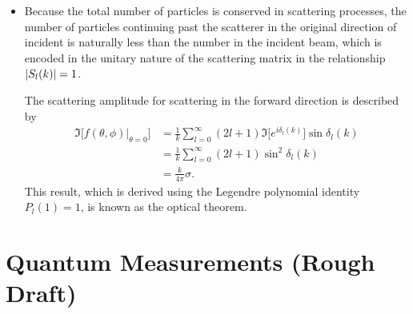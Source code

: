 \documentclass[11pt, a4paper]{article}
\begin{document}
\begin{itemize}
    \item Because the total number of particles is conserved in scattering processes, the number of particles continuing past the scatterer in the original direction of incident is naturally less than the number in the incident beam, which is encoded in the unitary nature of the scattering matrix in the relationship $ \abs{S_{l}(k)} = 1 $. 

    The scattering amplitude for scattering in the forward direction is described by
    \begin{align*}
        \Im \big[ f(\theta, \phi)\big |_{\theta = 0} \big] &= \frac{1}{k} \sum_{l = 0}^{\infty} (2l + 1) \Im \big[ e^{i\delta_{l}(k)} \big] \sin \delta_{l}(k) \\
        & = \frac{1}{k} \sum_{l = 0}^{\infty} (2l + 1) \sin^{2} \delta_{l}(k)\\
        &= \frac{k}{4\pi} \sigma.
    \end{align*}
    This result, which is derived using the Legendre polynomial identity $ P_{l}(1) = 1 $, is known as the optical theorem. 
    
    
\end{itemize}

\newpage
\section{Quantum Measurements (Rough Draft)}
\end{document}
